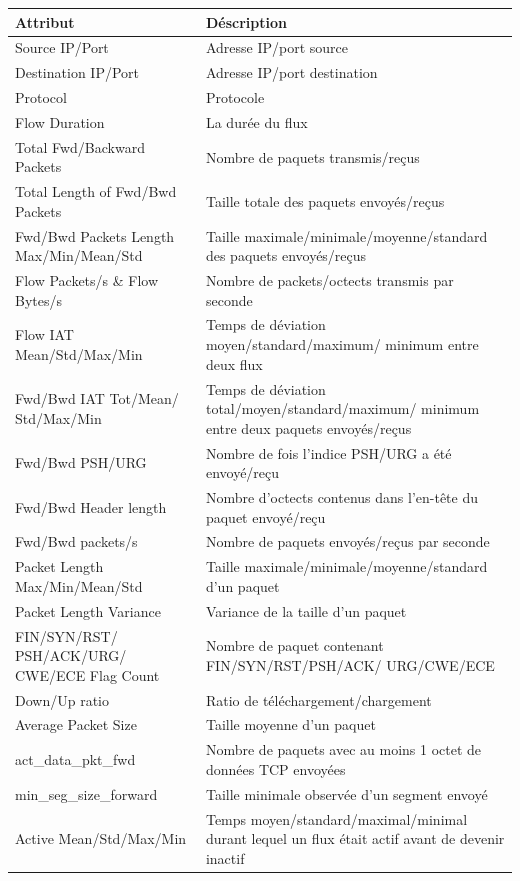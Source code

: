 \begin{longtable}{ | m{5cm} | m{11cm} | }
\hline
\textbf{Attribut} & \textbf{Déscription}\\
\hline
Source IP/Port & Adresse IP/port source\\
\hline
Destination IP/Port & Adresse IP/port destination\\
\hline
Protocol & Protocole \\
\hline
Flow Duration &  La durée du flux\\
\hline
Total Fwd/Backward Packets & Nombre de paquets transmis/reçus \\
\hline
Total Length of Fwd/Bwd Packets & Taille totale des paquets envoyés/reçus \\
\hline
Fwd/Bwd Packets Length Max/Min/Mean/Std &  Taille maximale/minimale/moyenne/standard des paquets envoyés/reçus\\ 
\hline
Flow Packets/s \& Flow Bytes/s & Nombre de packets/octects transmis par seconde\\
\hline
Flow IAT Mean/Std/Max/Min & Temps de déviation moyen/standard/maximum/ minimum entre deux flux\\
\hline
Fwd/Bwd IAT Tot/Mean/ Std/Max/Min & Temps de déviation total/moyen/standard/maximum/ minimum entre deux paquets envoyés/reçus\\
\hline
Fwd/Bwd PSH/URG & Nombre de fois l'indice PSH/URG a été envoyé/reçu\\
\hline
Fwd/Bwd Header length & Nombre d'octects contenus dans l'en-tête du paquet envoyé/reçu\\
\hline
Fwd/Bwd packets/s & Nombre de paquets envoyés/reçus par seconde\\
\hline
Packet Length Max/Min/Mean/Std & Taille maximale/minimale/moyenne/standard d'un paquet\\
\hline
Packet Length Variance & Variance de la taille d'un paquet\\
\hline
FIN/SYN/RST/ PSH/ACK/URG/ CWE/ECE Flag Count & Nombre de paquet contenant FIN/SYN/RST/PSH/ACK/ URG/CWE/ECE\\
\hline
Down/Up ratio & Ratio de téléchargement/chargement\\
\hline 
Average Packet Size & Taille moyenne d'un paquet\\
\hline
act\_data\_pkt\_fwd & Nombre de paquets avec au moins 1 octet de données TCP envoyées\\
\hline
min\_seg\_size\_forward & Taille minimale observée d'un segment envoyé\\
\hline
Active Mean/Std/Max/Min & Temps moyen/standard/maximal/minimal durant lequel un flux était actif avant de devenir inactif\\

\end{longtable}
